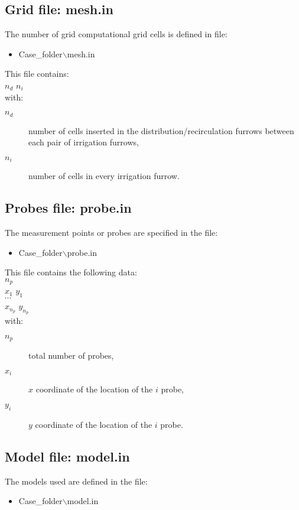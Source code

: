 \subsection{Grid file: mesh.in}

The number of grid computational grid cells is defined in file:
\begin{itemize}
\item Case\_folder$\backslash$mesh.in
\end{itemize}

This file contains:\\
$n_d$ $n_i$\\
with:
\begin{description}
\item[$n_d$] number of cells inserted in the distribution/recirculation furrows between each pair of irrigation furrows,
\item[$n_i$] number of cells in every irrigation furrow.
\end{description}

\subsection{Probes file: probe.in}

The measurement points or probes are specified in the file:
\begin{itemize}
\item Case\_folder$\backslash$probe.in
\end{itemize}

This file contains the following data:\\
$n_p$\\
$x_1$ $y_1$\\
$\cdots$\\
$x_{n_p}$ $y_{n_p}$\\
with:
\begin{description}
\item[$n_p$] total number of probes,
\item[$x_i$] $x$ coordinate of the location of the $i$ probe,
\item[$y_i$] $y$ coordinate of the location of the $i$ probe.
\end{description}

\subsection{Model file: model.in}

The models used are defined in the file:
\begin{itemize}
\item Case\_folder$\backslash$model.in
\end{itemize}

